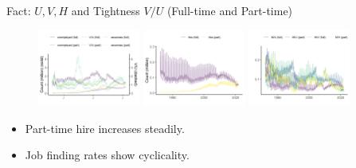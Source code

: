 \documentclass[aspectratio=169]{beamer}
\begin{document}
\begin{frame}{Fact: $U,V,H$ and Tightness $V/U$ (Full-time and Part-time)}
    \begin{figure}[!ht]
  \begin{center}
  \includegraphics[width = 0.3\textwidth]
  {figuretable/unemployed_vacancy_month_full_time_part_time.png}
  \includegraphics[width = 0.3\textwidth]
  {figuretable/hire_month_full_time_part_time.png}
  \includegraphics[width = 0.3\textwidth]
  {figuretable/job_finding_rate_worker_finding_rate_month_full_time_part_time.png}
  \end{center}
  \footnotesize
\end{figure} 
\begin{itemize}
    \item Part-time hire increases steadily.
    \item Job finding rates show cyclicality.
\end{itemize}

\end{frame}
\end{document}
